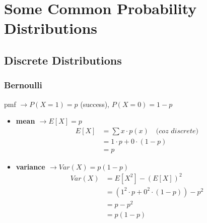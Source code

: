 \section{\textcolor{secondary}{Some Common Probability Distributions}}

\subsection{Discrete Distributions}

\subsubsection{Bernoulli}
pmf $\rightarrow P(X=1) = p$ (success), $P(X=0) = 1-p$
\begin{itemize}
    \item \textbf{mean $\rightarrow E[X] = p$}
    \begin{align*}
        E[X] &= \sum x \cdot p(x) \quad \textit{(coz discrete)} \\
        &= 1 \cdot p + 0 \cdot (1-p) \\
        &= p
    \end{align*}
    \item \textbf{variance $\rightarrow Var(X) = p(1-p)$}
    \begin{align*}
        Var(X) &= E[X^2] - (E[X])^2 \\
        &= (1^2 \cdot p + 0^2 \cdot (1-p)) - p^2 \\
        &= p - p^2 \\
        &= p(1-p)
    \end{align*}
\end{itemize}

